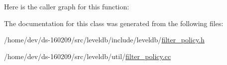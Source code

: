 Here is the caller graph for this function\+:




The documentation for this class was generated from the following files\+:\begin{DoxyCompactItemize}
\item 
/home/dev/ds-\/160209/src/leveldb/include/leveldb/\hyperlink{filter__policy_8h}{filter\+\_\+policy.\+h}\item 
/home/dev/ds-\/160209/src/leveldb/util/\hyperlink{filter__policy_8cc}{filter\+\_\+policy.\+cc}\end{DoxyCompactItemize}
